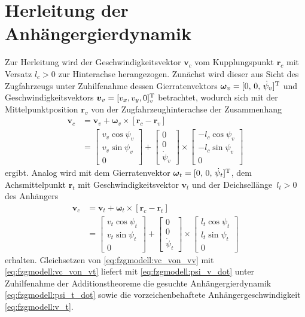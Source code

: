 \section{Herleitung der Anhängergierdynamik} \label{app:herleitung_anhaengerdynamik}
Zur Herleitung wird der Geschwindigkeitsvektor $\boldsymbol v_c$ vom Kupplungspunkt  $\boldsymbol r_c$ mit Versatz $l_c>0$ zur Hinterachse herangezogen. Zunächst wird dieser aus Sicht des Zugfahrzeugs unter Zuhilfenahme dessen Gierratenvektors $\boldsymbol\omega_v=[0,\,0,\,\dot\psi_v]^{{\rm T}}$ und Geschwindigkeitsvektors $\boldsymbol v_v = [v_x, v_y, 0]^{{\rm T}}_v$ betrachtet, wodurch sich mit der Mittelpunktposition $\boldsymbol r_v$ von der Zugfahrzeughinterachse der Zusammenhang
\begin{align} \nonumber
	\boldsymbol v_c &= \boldsymbol v_v+\boldsymbol\omega_v\times\left[\boldsymbol r_c-\boldsymbol r_v\right] \\
	&= \begin{bmatrix}v_v\cos\psi_v\\v_v\sin\psi_v\\0\end{bmatrix}+\begin{bmatrix}0\\0\\\dot\psi_v\end{bmatrix}\times\begin{bmatrix}-l_c\cos\psi_v\\-l_c\sin\psi_v\\0\end{bmatrix}\label{eq:fzgmodell:vc_von_vv}
\end{align}
ergibt. Analog wird mit dem Gierratenvektor $\boldsymbol\omega_t=[0,\,0,\,\dot\psi_t]^{{\rm T}}$, dem  Achsmittelpunkt $\boldsymbol r_t$ mit Geschwindigkeitsvektor $\boldsymbol v_t$  und der Deichsellänge~$l_t>0$ des Anhängers
\begin{align} \nonumber
	\boldsymbol v_c &= \boldsymbol v_t+\boldsymbol\omega_t\times\left[\boldsymbol r_c-\boldsymbol r_t\right] \\
	&= \begin{bmatrix}v_t\cos\psi_t\\v_t\sin\psi_t\\0\end{bmatrix}+\begin{bmatrix}0\\0\\\dot\psi_t\end{bmatrix}\times\begin{bmatrix}l_t\cos\psi_t\\l_t\sin\psi_t\\0\end{bmatrix}\label{eq:fzgmodell:vc_von_vt}
\end{align}
erhalten. Gleichsetzen von \eqref{eq:fzgmodell:vc_von_vv} mit \eqref{eq:fzgmodell:vc_von_vt} liefert mit \eqref{eq:fzgmodell:psi_v_dot} unter Zuhilfenahme der Additionstheoreme die gesuchte Anhängergierdynamik \eqref{eq:fzgmodell:psi_t_dot} sowie die vorzeichenbehaftete Anhängergeschwindigkeit \eqref{eq:fzgmodell:v_t}.

